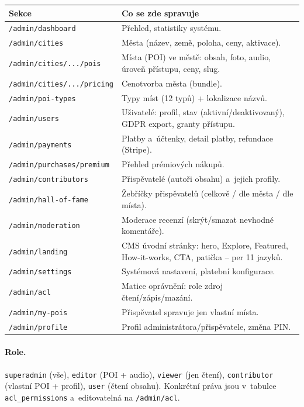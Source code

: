 \documentclass[11pt,a4paper]{article}
\newcommand{\code}[1]{\texttt{#1}}
\begin{document}
\begin{longtable}{@{}p{4.6cm}p{9.8cm}@{}}
\toprule
\textbf{Sekce} & \textbf{Co se zde spravuje} \\
\midrule
\endhead
\code{/admin/dashboard} & Přehled, statistiky systému. \\
\code{/admin/cities} & Města (název, země, poloha, ceny, aktivace). \\
\code{/admin/cities/.../pois} & Místa (POI) ve městě: obsah, foto, audio, úroveň přístupu, ceny, slug. \\
\code{/admin/cities/.../pricing} & Cenotvorba města (bundle). \\
\code{/admin/poi-types} & Typy míst (12 typů) + lokalizace názvů. \\
\code{/admin/users} & Uživatelé: profil, stav (aktivní/deaktivovaný), GDPR export, granty přístupu. \\
\code{/admin/payments} & Platby a~účtenky, detail platby, refundace (Stripe). \\
\code{/admin/purchases/premium} & Přehled prémiových nákupů. \\
\code{/admin/contributors} & Přispěvatelé (autoři obsahu) a~jejich profily. \\
\code{/admin/hall-of-fame} & Žebříčky přispěvatelů (celkově / dle města / dle místa). \\
\code{/admin/moderation} & Moderace recenzí (skrýt/smazat nevhodné komentáře). \\
\code{/admin/landing} & CMS úvodní stránky: hero, Explore, Featured, How-it-works, CTA, patička -- per 11 jazyků. \\
\code{/admin/settings} & Systémová nastavení, platební konfigurace. \\
\code{/admin/acl} & Matice oprávnění: role \texttimes{} zdroj \texttimes{} čtení/zápis/mazání. \\
\code{/admin/my-pois} & Přispěvatel spravuje jen vlastní místa. \\
\code{/admin/profile} & Profil administrátora/přispěvatele, změna PIN. \\
\bottomrule
\end{longtable}

\paragraph{Role.} \code{superadmin} (vše), \code{editor} (POI + audio),
\code{viewer} (jen čtení), \code{contributor} (vlastní POI + profil),
\code{user} (čtení obsahu). Konkrétní práva jsou v~tabulce \code{acl\_permissions}
a~editovatelná na \code{/admin/acl}.
\end{document}
